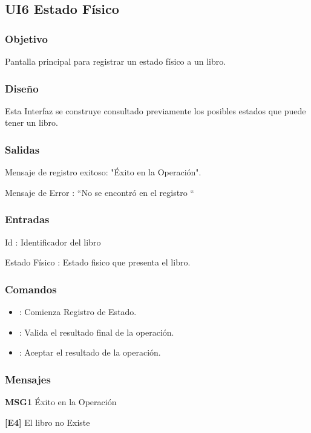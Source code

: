 \newpage
\subsection{UI6 Estado Físico}

\subsubsection{Objetivo}
	Pantalla principal para registrar un estado físico a un libro.

\subsubsection{Diseño}
	Esta Interfaz se construye consultado previamente los posibles estados que puede tener un libro.


\subsubsection{Salidas}
	\begin{Citemize}
		\item Mensaje de registro exitoso:  "Éxito en la Operación".
		\item Mensaje de Error : “No se encontró en el registro “ 
	\end{Citemize}
	
\subsubsection{Entradas}
	\begin{Citemize}
		\item Id : Identificador del libro
		\item Estado Físico : Estado fisico que presenta el libro.
	\end{Citemize}

\subsubsection{Comandos} 
\begin{itemize}
	\item {}: Comienza Registro de Estado.
	\item {}: Valida el resultado final de la operación.
	\item {}: Aceptar el resultado de la operación.
\end{itemize}

\subsubsection{Mensajes}
	\begin{Citemize}
		\item {\bf  MSG1} Éxito en la Operación
		 \item {\bf [E4]} El libro no Existe
	\end{Citemize}

